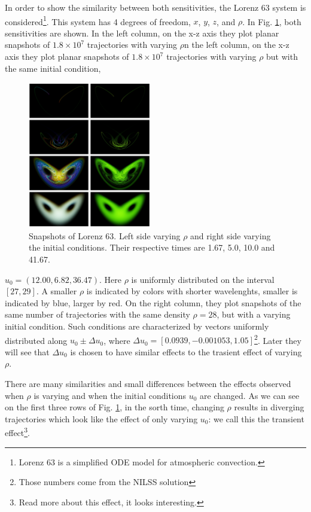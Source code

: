\documentclass[12pt,twoside,a4paper]{article} %
\begin{document}
In order to show the similarity between both sensitivities, the Lorenz 63 system is considered\footnote{Lorenz 63 is a simplified ODE model for atmospheric convection.}. This system has 4 degrees of freedom, $x$, $y$, $z$, and $\rho$. In Fig. \ref{fig:lz63}, both sensitivities are shown. In the left column, on the x-z axis they plot planar snapshots of $1.8\times10^7$ trajectories with varying $\rho$n the left column, on the x-z axis they plot planar snapshots of $1.8\times10^7$ trajectories with varying $\rho$ but with the same initial condition,
\begin{figure} %
  \begin{center}
    \includegraphics[width=0.48\textwidth]{lz63.png}
  \end{center}
  \caption{Snapshots of Lorenz 63. Left side varying $\rho$ and right side varying the initial conditions. Their respective times are 1.67, 5.0, 10.0 and 41.67.}
  \label{fig:lz63}
\end{figure}
$u_0 = (12.00, 6.82, 36.47)$. Here $\rho$ is uniformly distributed on the interval $[27,29]$. A smaller $\rho$ is indicated by colors with shorter wavelenghts, smaller is indicated by blue, larger by red. On the right column, they plot snapshots of the same number of trajectories with the same density $\rho = 28$, but with a varying initial condition. Such conditions are characterized by vectors uniformly distributed along $u_0 \pm \Delta u_0$, where $\Delta u_0 = [0.0939,-0.001053,1.05]$\footnote{Those numbers come from the NILSS solution}. Later they will see that $\Delta u_0$ is chosen to have similar effects to the trasient effect of varying $\rho$.

There are many similarities and small differences between the effects observed when $\rho$ is varying and when the initial conditions $u_0$ are changed. As we can see on the first three rows of Fig. \ref{fig:lz63}, in the sorth time, changing $\rho$ results in diverging trajectories which look like the effect of only varying $u_0$: we call this the transient effect\footnote{Read more about this effect, it looks interesting.}.
\end{document}

